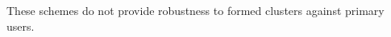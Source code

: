 \documentclass[10pt,journal,compsoc]{IEEEtran}
\theoremstyle{mytheoremstyle}
\theoremstyle{mytheoremstyle}
\theoremstyle{mytheoremstyle}
\begin{document}
These schemes do not provide robustness to formed clusters against primary users. 


\end{document}
